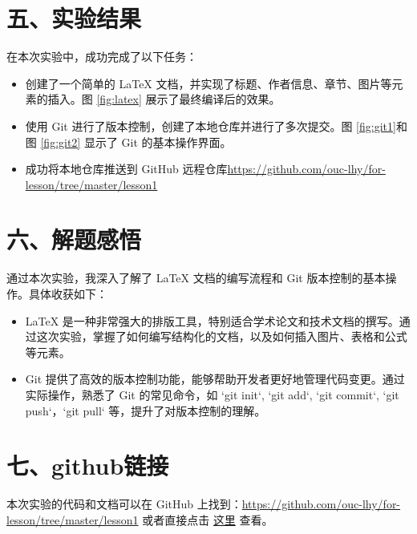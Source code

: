 \documentclass[a4paper, 12pt]{article}
\begin{document}
\section*{五、实验结果}
在本次实验中，成功完成了以下任务：
\begin{itemize}
    \item 创建了一个简单的 LaTeX 文档，并实现了标题、作者信息、章节、图片等元素的插入。图 \ref{fig:latex} 展示了最终编译后的效果。
    \item 使用 Git 进行了版本控制，创建了本地仓库并进行了多次提交。图 \ref{fig:git1}和图 \ref{fig:git2} 显示了 Git 的基本操作界面。
    \item 成功将本地仓库推送到 GitHub 远程仓库\url{https://github.com/ouc-lhy/for-lesson/tree/master/lesson1}
\end{itemize}

\section*{六、解题感悟}
通过本次实验，我深入了解了 LaTeX 文档的编写流程和 Git 版本控制的基本操作。具体收获如下：
\begin{itemize}
    \item LaTeX 是一种非常强大的排版工具，特别适合学术论文和技术文档的撰写。通过这次实验，掌握了如何编写结构化的文档，以及如何插入图片、表格和公式等元素。
    \item Git 提供了高效的版本控制功能，能够帮助开发者更好地管理代码变更。通过实际操作，熟悉了 Git 的常见命令，如 `git init`, `git add`, `git commit`, `git push`，`git pull` 等，提升了对版本控制的理解。
\end{itemize}

\section*{七、github链接}

本次实验的代码和文档可以在 GitHub 上找到：\url{https://github.com/ouc-lhy/for-lesson/tree/master/lesson1} 或者直接点击 \href{https://github.com/ouc-lhy/for-lesson/tree/master/lesson1}{这里} 查看。
\end{document}
